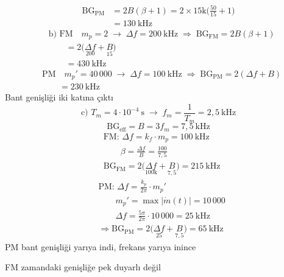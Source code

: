 \documentclass[11pt,a4paper]{article}
\begin{document}
\begin{align*}
\mathrm{BG}_{\mathrm{PM}}&=2B(\beta+1)=2\times15\mathrm{k}\Big(\frac{50}{15}+1\Big)\\
&=130\ \mathrm{kHz}
\end{align*}
\begin{align*}
&\text{b) FM}\quad m_p=2\;\to\;\Delta f=200\ \mathrm{kHz}\;\Rightarrow\;\mathrm{BG}_{\mathrm{FM}}=2B(\beta+1)\\
&\qquad=2\big(\underset{200}{\Delta f}+\underset{15}{B}\big)\\
&\qquad=430\ \mathrm{kHz}
\end{align*}
\begin{align*}
&\text{PM}\quad m_p'=40\,000\;\to\;\Delta f=100\ \mathrm{kHz}\;\Rightarrow\;\mathrm{BG}_{\mathrm{PM}}=2(\Delta f+B)\\
&\qquad=230\ \mathrm{kHz}
\end{align*}
Bant genişliği iki katına çıktı
\[ \text{c) }T_m=4\cdot10^{-4}\ \mathrm{s}\;\to\;f_m=\frac{1}{T_m}=2{,}5\ \mathrm{kHz} \]
\[ \mathrm{BG}_{\mathrm{eff}}=B=3f_m=7{,}5\ \mathrm{kHz} \]
\begin{align*}
&\text{FM: }\Delta f=k_f\cdot m_p=100\ \mathrm{kHz}\\
&\qquad\beta=\frac{\Delta f}{B}=\frac{100}{7{,}5}\\
&\mathrm{BG}_{\mathrm{FM}}=2\big(\underset{100\mathrm{k}}{\Delta f}+\underset{7{,}5}{B}\big)=215\ \mathrm{kHz}
\end{align*}
\begin{align*}
&\text{PM: }\Delta f=\frac{k_p}{2\pi}\cdot m_p'\\
&\qquad m_p'=\max|\dot m(t)|=10\,000\\
&\qquad\Delta f=\frac{5\pi}{2\pi}\cdot10\,000=25\ \mathrm{kHz}\\
&\Rightarrow\mathrm{BG}_{\mathrm{PM}}=2\big(\underset{25}{\Delta f}+\underset{7{,}5}{B}\big)=65\ \mathrm{kHz}
\end{align*}
PM bant genişliği yarıya indi, frekans yarıya inince

FM zamandaki genişliğe pek duyarlı değil
\end{document}
